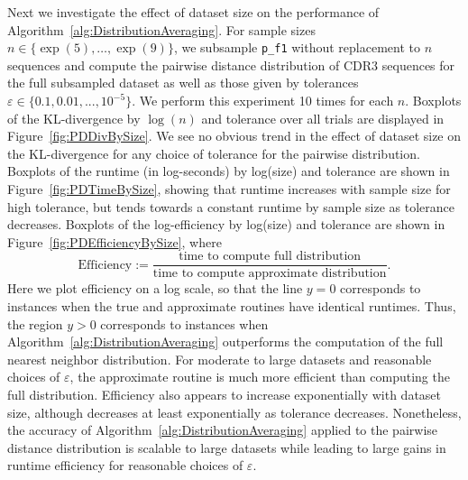 \documentclass{article}
\begin{document}
Next we investigate the effect of dataset size on the performance of Algorithm~\ref{alg:DistributionAveraging}.
For sample sizes $n \in \{\exp(5), \dotsc, \exp(9)\}$, we subsample \texttt{p\_f1} without replacement to $n$ sequences and compute the pairwise distance distribution of CDR3 sequences for the full subsampled dataset as well as those given by tolerances $\varepsilon \in \{0.1, 0.01, ..., 10^{-5} \}$.
We perform this experiment 10 times for each $n$.
Boxplots of the KL-divergence by $\log(n)$ and tolerance over all trials are displayed in Figure~\ref{fig:PDDivBySize}.
We see no obvious trend in the effect of dataset size on the KL-divergence for any choice of tolerance for the pairwise distribution.
Boxplots of the runtime (in log-seconds) by log(size) and tolerance are shown in Figure~\ref{fig:PDTimeBySize}, showing that runtime increases with sample size for high tolerance, but tends towards a constant runtime by sample size as tolerance decreases.
Boxplots of the log-efficiency by log(size) and tolerance are shown in Figure~\ref{fig:PDEfficiencyBySize}, where
\begin{equation}\label{eq:Efficiency}
	\text{Efficiency} :=
		\frac{\text{time to compute full distribution}
		}{
			  \text{time to compute approximate distribution}
		}.
\end{equation}
Here we plot efficiency on a log scale, so that the line $y=0$ corresponds to instances when the true and approximate routines have identical runtimes.
Thus, the region $y > 0$ corresponds to instances when Algorithm~\ref{alg:DistributionAveraging} outperforms the computation of the full nearest neighbor distribution.
For moderate to large datasets and reasonable choices of $\varepsilon$, the approximate routine is much more efficient than computing the full distribution.
Efficiency also appears to increase exponentially with dataset size, although decreases at least exponentially as tolerance decreases.
Nonetheless, the accuracy of Algorithm~\ref{alg:DistributionAveraging} applied to the pairwise distance distribution is scalable to large datasets while leading to large gains in runtime efficiency for reasonable choices of $\varepsilon$.
\end{document}
